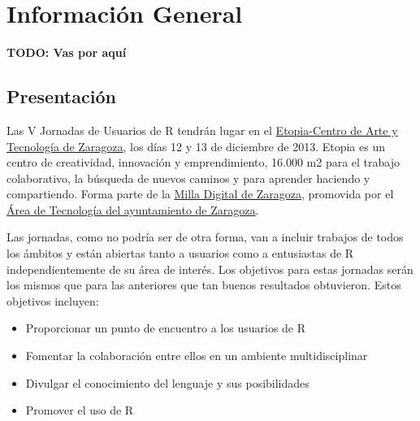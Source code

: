 \part{Información General}

\textbf{TODO: Vas por aquí}
\chapter{Presentación}

Las V Jornadas de Usuarios de R tendrán lugar en el
\href{http://www.zaragoza.es/ciudad/idezar/detalle_Centro?id=5105}{Etopia-Centro
  de Arte y Tecnología de Zaragoza}, los días 12 y 13 de diciembre de
2013. Etopia es un centro de creatividad, innovación y emprendimiento,
16.000 m2 para el trabajo colaborativo, la búsqueda de nuevos caminos
y para aprender haciendo y compartiendo. Forma parte de la
\href{http://www.zaragoza.es/ciudad/sectores/tecnologia/milladigital.htm}{Milla
  Digital de Zaragoza}, promovida por el
\href{http://www.zaragoza.es/ciudad/sectores/tecnologia/}{Área de
  Tecnología del ayuntamiento de Zaragoza}.

Las jornadas, como no podría ser de otra forma, van a incluir trabajos
de todos los ámbitos y están abiertas tanto a usuarios como a
entusiastas de R independientemente de su área de interés. Los
objetivos para estas jornadas serán los mismos que para las anteriores
que tan buenos resultados obtuvieron. Estos objetivos incluyen:

\begin{itemize}
\item Proporcionar un punto de encuentro a los usuarios de R 
\item Fomentar la colaboración entre ellos en un ambiente multidisciplinar 
\item Divulgar el conocimiento del lenguaje y sus posibilidades 
\item Promover el uso de R 
\end{itemize}

